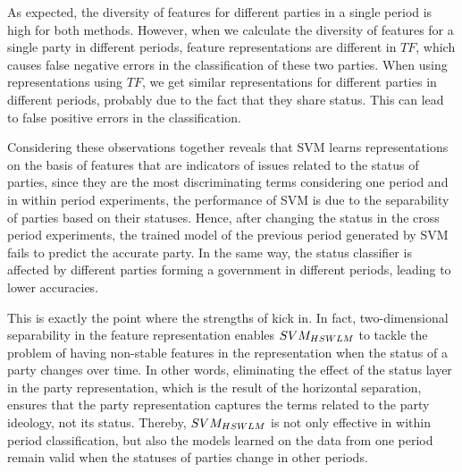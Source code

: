 As expected, the diversity of features for different parties in a single period is high for both methods. However, when we calculate the diversity of features for a single party in different periods, feature representations are different in  $TF$, which causes false negative errors in the classification of these two parties. 
When using representations using $TF$, we get similar representations for different parties in different periods, probably due to the fact that they share status. This can lead to false positive errors in the classification. 

Considering these observations together reveals that SVM learns representations on the basis of features that are indicators of issues related to the status of parties, since they are the most discriminating terms considering one period and in within period experiments, the performance of SVM is due to the separability of parties based on their statuses. Hence, after changing the status in the cross period experiments, the trained model of the previous period generated by SVM fails to predict the accurate party.  In the same way, the status classifier is affected by different parties forming a government in different periods, leading to lower accuracies.   

This is exactly the point where the strengths of \achswlm kick in. In fact, two-dimensional separability in the feature representation enables $SVM_{HSWLM}$ to tackle the problem of having non-stable features in the representation when the status of a party changes over time. In other words, eliminating the effect of the status layer in the party representation, which is the result of the horizontal separation, ensures that the party representation captures the terms related to the party ideology, not its status. Thereby, $SVM_{HSWLM}$ is not only effective in within period classification, but also the models learned on the data from one period remain valid when the statuses of parties change in other periods. 
